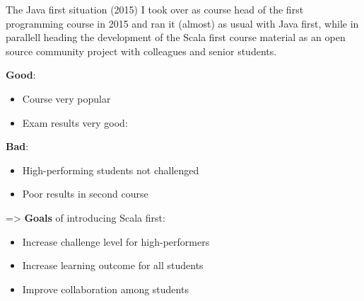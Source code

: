 \documentclass[aspectratio=169]{beamer}
\newenvironment{Slide}[1]%
  {\begin{frame}[environment=Slide]{#1}}
  {\end{frame}}%
\begin{document}
\begin{Slide}{The Java first situation (2015)}
  I took over as course head of the first programming course in 2015 and ran it (almost) as usual with Java first, while in parallell heading the development of the Scala first course material as an open source community project with colleagues and senior students.

  \vspace{0.5em}%
  \begin{minipage}[t]{0.42\textwidth}
      \textbf{Good}:
      \begin{itemize}
        \item Course very popular
        \item Exam results very good:  
      
      \end{itemize}
    \end{minipage}%
    \begin{minipage}[t]{0.6\textwidth}
      \textbf{Bad}:
      \begin{itemize}
        \item High-performing students not challenged
        \item Poor results in second course
      \end{itemize}   
      
      \pause\vspace{0.5em}=> \textbf{Goals} of introducing Scala first:
      \begin{itemize}
        \item Increase challenge level for high-performers 
        \item Increase learning outcome for all students
        \item Improve collaboration among students
      \end{itemize}   
      
    \end{minipage}
\end{Slide}
\end{document}
